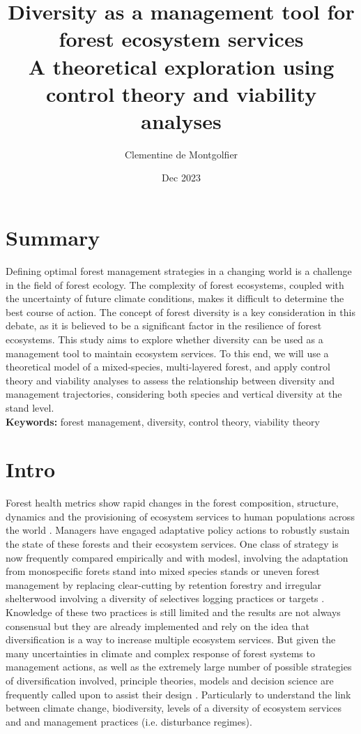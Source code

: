 \documentclass{article}
\title{Diversity as a management tool for forest ecosystem services \\ 
\large A theoretical exploration using control theory and viability analyses}
\author{Clementine de Montgolfier}
\date{Dec 2023}
\begin{document}
\maketitle

\section{Summary}

Defining optimal forest management strategies in a changing world is a challenge in the field of forest ecology. The complexity of forest ecosystems, coupled with the uncertainty of future climate conditions, makes it difficult to determine the best course of action. The concept of forest diversity is a key consideration in this debate, as it is believed to be a significant factor in the resilience of forest ecosystems. This study aims to explore whether diversity can be used as a management tool to maintain ecosystem services. To this end, we will use a theoretical model of a mixed-species, multi-layered forest, and apply control theory and viability analyses to assess the relationship between diversity and management trajectories, considering both species and vertical diversity at the stand level.\\

\noindent \textbf{Keywords:} forest management, diversity, control theory, viability theory

\section{Intro}

Forest health metrics show rapid changes in the forest composition, structure, dynamics and the provisioning of ecosystem services to human populations across the world \citep{REFS}. Managers have engaged adaptative policy actions to robustly sustain the state of these forests and their ecosystem services. One class of strategy is now frequently compared empirically and with modesl, involving the adaptation from monospecific forets stand into mixed species stands or uneven forest management by replacing clear-cutting by retention forestry and irregular shelterwood involving a diversity of selectives logging practices or targets \citep{Raymond2009}. Knowledge of these two practices is still limited and the results are not always consensual but they are already implemented and rely on the idea that diversification is a way to increase multiple ecosystem services. But given the many uncertainties in climate and complex response of forest systems to management actions, as well as the extremely large number of possible strategies of diversification involved, principle theories, models and decision science are frequently called upon to assist their design \citep{REFS}. Particularly to understand the link between climate change, biodiversity, levels of a diversity of ecosystem services and and management practices (i.e. disturbance regimes). \\
\end{document}
